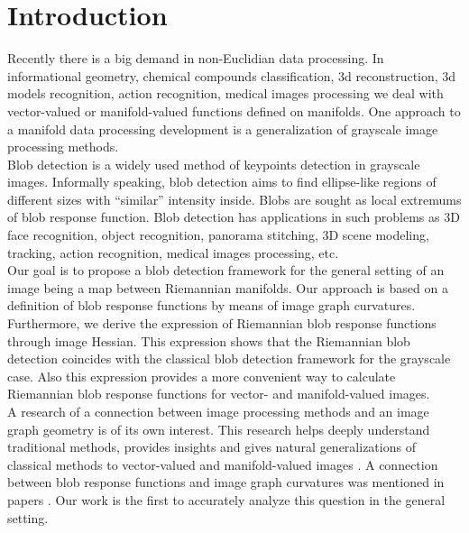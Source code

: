 \documentclass{llncs}
\begin{document}
\section{Introduction}
%
Recently there is a big demand in non-Euclidian data processing. In informational geometry, chemical compounds classification, 3d reconstruction, 3d models recognition, action recognition, medical images processing we deal with vector-valued or manifold-valued functions defined on manifolds. One approach to a manifold data processing development is a generalization of grayscale image processing methods. 
\\
Blob detection \cite{blob} is a widely used method of keypoints detection in grayscale images. Informally speaking, blob detection aims to find ellipse-like regions of different sizes with “similar” intensity inside. Blobs are sought as local extremums of blob response function. Blob detection has applications in such problems as 3D face recognition, object recognition, panorama stitching, 3D scene modeling, tracking, action recognition, medical images processing, etc.
\\
Our goal is to propose a blob detection framework for the general setting of an image being a map between Riemannian manifolds. Our approach is based on a definition of blob response functions by means of image graph curvatures. Furthermore, we derive the expression of Riemannian blob response functions through image Hessian. This expression shows that the Riemannian blob detection coincides with the classical blob detection framework for the grayscale case. Also this expression provides a more convenient way to calculate Riemannian blob response functions for vector- and manifold-valued images.
\\
A research of a connection between image processing methods and an image graph geometry is of its own interest. This research helps deeply understand traditional methods, provides insights and gives natural generalizations of classical methods to vector-valued and manifold-valued images \cite{Saucan,Kimmel,Batard}. A connection between blob response functions and image graph curvatures was mentioned in papers \cite{BlobCurv1,BlobCurv2}. Our work is the first to accurately analyze this question in the general setting.
\end{document}
